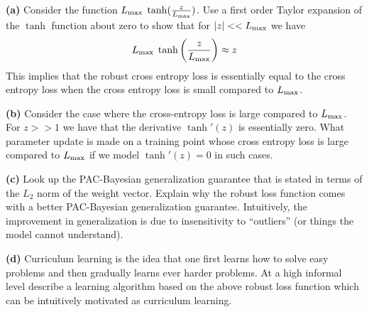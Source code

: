 \documentclass{article}
\newcommand{\solution}[1]{}
\begin{document}
\medskip
{\bf (a)}  Consider the function $L_{\max} \;\tanh(\frac{z}{L_{\max}})$. Use a first order Taylor expansion of the $\tanh$ function about zero to show that for $|z| << L_{\max}$ we have
$$L_{\max}\; \tanh\left(\frac{z}{L_{\max}}\right) \approx z$$
This implies that the robust cross entropy loss is essentially equal to the cross entropy loss when the cross entropy loss is small compared to $\lmax$.

\solution{
  The first order Taylor expansion of the $\tanh$ function about zero is
  $$\tanh(u) \approx u$$ yielding the desired result.
}

\medskip
{\bf (b)} Consider the case where the cross-entropy loss is large compared to $\lmax$.  For $z >> 1$ we have that the derivative $\tanh'(z)$ is essentially zero.
What parameter update is made on a training point whose cross entropy loss is large compared to $\lmax$ if we model $\tanh'(z) = 0$ in such cases.

\solution{
  The update on a data point $(x,y)$ is
  $$\Phi^{t+1} = \Phi^t - \eta \nabla_\Phi {\cal L}(\Phi,x,y)$$
  At a point where the derivative of the sigmoid is essentially zero this update will be essentially zero.  So ``outliers'' do not effect the model parameters.
}

\medskip
{\bf (c)} Look up the PAC-Bayesian generalization guarantee that is stated in terms of the $L_2$ norm of the weight vector.
Explain why the robust loss function comes with a better PAC-Bayesian generalization guarantee.  Intuitively, the improvement in generalization
is due to insensitivity to ``outliers'' (or things the model cannot understand).

\solution{
  The $L_2$ PAC-Bayeisan guarantee in the notes is
  $${\cal L}_\sigma(\Phi) \leq \frac{10}{9}\left(\hat{\cal L}_\sigma(\Phi) + \frac{5\lmax}{N}\left(\frac{||\Phi -\Phi_{\mathrm{init}}||^2}{2\sigma^2} + \ln \frac{1}{\delta}\right)\right)$$
  Reducing $\lmax$ both reduces $\hat{L}_\sigma(\Phi)$ and reduces the penalty for the model complexity (the norm squared of the distance from the initialization).
}

\medskip
{\bf (d)} Curriculum learning is the idea that one first learns how to solve easy problems and then gradually learns ever harder problems. At a high informal level describe a learning algorithm based on the above robust loss function
which can be intuitively motivated as curriculum learning.


\solution{
  Easier problems should correspond to cases where the cross entropy loss can be made small.  So setting $\lmax$ to be smallish will focus the model on the easy problems while ignoring the hard problems.
  Gradually increasing $\lmax$ will gradually pay more attention to the harder problems.

  \medskip
  Another possible answer is that holding $\lmax$ fixed will focus first on the easy problems ignoring the hard problems but as the understanding of easy problems improves the harder problems become easy problems and
  we automatically gradually pay attention to harder and harder problems even with a fixed value of $\lmax$.
}
\end{document}
